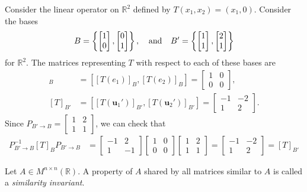 \documentclass[12pt,letterpaper,reqno]{article}
\numberwithin{equation}{section}
\newcommand{\R}{\ensuremath{\mathbb R}}
\newcommand{\bu}{\mathbf{u}}
\begin{document}
\begin{example}
Consider the linear operator on $\R^2$ defined by $T(x_1,x_2)=(x_1,0)$. Consider the bases
\begin{align*}
	B=\left\{\begin{bmatrix}
		1 \\ 0
	\end{bmatrix}, \begin{bmatrix}
		0 \\ 1
	\end{bmatrix}\right\}, \hspace{0.25cm} \text{ and } \hspace{0.25cm} B'=\left\{\begin{bmatrix}
		1 \\ 1
	\end{bmatrix}, \begin{bmatrix}
		2 \\ 1
	\end{bmatrix}\right\}
\end{align*}
for $\R^2$. The matrices representing $T$ with respect to each of these bases are 
\begin{align*}
	[T]_{B}&=[[T(e_1)]_B,[T(e_2)]_B]=\begin{bmatrix}
		1 & 0 \\
		0 & 0
	\end{bmatrix}, \\
	[T]_{B'}&=[[T(\bu_1')]_{B'},[T(\bu_2')]_{B'}]=\begin{bmatrix}
		-1 & -2 \\
		1 & 2
	\end{bmatrix}.
\end{align*}
Since $P_{B' \to B}=\begin{bmatrix}
	1 & 2 \\
	1 & 1
\end{bmatrix}$, we can check that
\begin{align*}
	P_{B' \to B}^{-1}[T]_BP_{B' \to B}&=\begin{bmatrix}
		-1 & 2 \\
		1 & -1
	\end{bmatrix}\begin{bmatrix}
		1 & 0 \\
		0 & 0
	\end{bmatrix}\begin{bmatrix}
		1 & 2 \\ 1 & 1 
	\end{bmatrix}=\begin{bmatrix}
		-1 & -2 \\
		1 & 2
	\end{bmatrix}=[T]_{B'}
\end{align*}
\end{example}
\begin{defn}
	Let $A \in M^{n \times n}(\R)$. A property of $A$ shared by all matrices similar to $A$ is called a \emph{similarity invariant}.
\end{defn}
\end{document}
